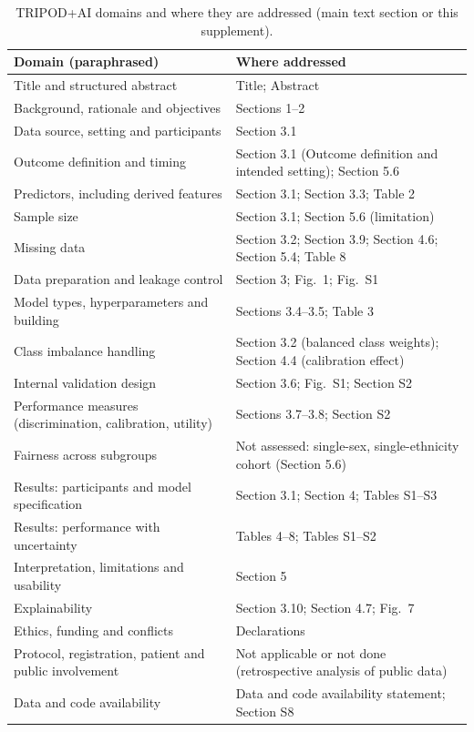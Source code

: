 \documentclass[11pt]{article}
\begin{document}
\begin{table}[H]
\centering
\caption{TRIPOD+AI domains and where they are addressed (main text section or this supplement).}
\label{tab:tripod}
\small
\begin{tabularx}{\linewidth}{lL}
\toprule
Domain (paraphrased) & Where addressed \\
\midrule
Title and structured abstract & Title; Abstract \\
Background, rationale and objectives & Sections 1--2 \\
Data source, setting and participants & Section 3.1 \\
Outcome definition and timing & Section 3.1 (Outcome definition and intended setting); Section 5.6 \\
Predictors, including derived features & Section 3.1; Section 3.3; Table 2 \\
Sample size & Section 3.1; Section 5.6 (limitation) \\
Missing data & Section 3.2; Section 3.9; Section 4.6; Section 5.4; Table 8 \\
Data preparation and leakage control & Section 3; Fig.~1; Fig.~S1 \\
Model types, hyperparameters and building & Sections 3.4--3.5; Table 3 \\
Class imbalance handling & Section 3.2 (balanced class weights); Section 4.4 (calibration effect) \\
Internal validation design & Section 3.6; Fig.~S1; Section S2 \\
Performance measures (discrimination, calibration, utility) & Sections 3.7--3.8; Section S2 \\
Fairness across subgroups & Not assessed: single-sex, single-ethnicity cohort (Section 5.6) \\
Results: participants and model specification & Section 3.1; Section 4; Tables S1--S3 \\
Results: performance with uncertainty & Tables 4--8; Tables S1--S2 \\
Interpretation, limitations and usability & Section 5 \\
Explainability & Section 3.10; Section 4.7; Fig.~7 \\
Ethics, funding and conflicts & Declarations \\
Protocol, registration, patient and public involvement & Not applicable or not done (retrospective analysis of public data) \\
Data and code availability & Data and code availability statement; Section S8 \\
\bottomrule
\end{tabularx}
\end{table}
\end{document}
